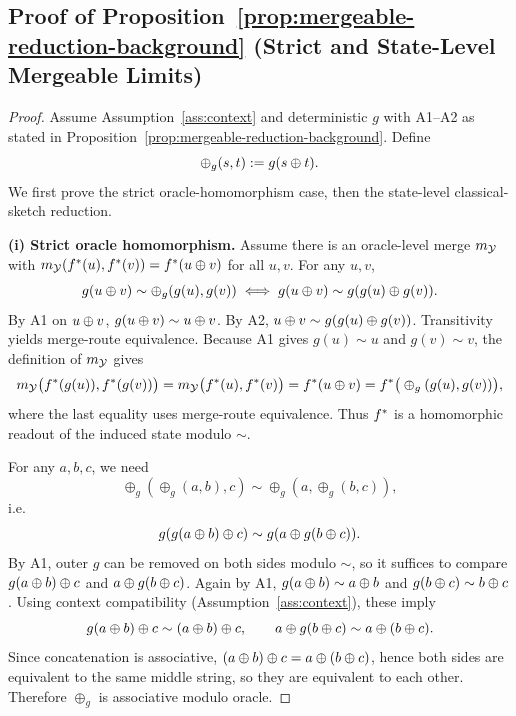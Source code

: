 \subsection{Proof of Proposition~\ref{prop:mergeable-reduction-background} (Strict and State-Level Mergeable Limits)}\label{app:proof-mergeable}

\begin{proof}
Assume Assumption~\ref{ass:context} and deterministic $g$ with A1--A2 as
stated in Proposition~\ref{prop:mergeable-reduction-background}. Define
\[
\oplus_g(s,t):=g(s\oplus t).
\]
We first prove the strict oracle-homomorphism case, then the state-level
classical-sketch reduction.

\textbf{(i) Strict oracle homomorphism.}
Assume there is an oracle-level merge $m_{\mathcal{Y}}$ with
$m_{\mathcal{Y}}(f^\ast(u),f^\ast(v))=f^\ast(u\oplus v)$ for all $u,v$.
For any $u,v$,
\[
g(u\oplus v)\sim \oplus_g(g(u),g(v))
  \iff g(u\oplus v)\sim g(g(u)\oplus g(v)).
\]
By A1 on $u\oplus v$, $g(u\oplus v)\sim u\oplus v$.
By A2, $u\oplus v\sim g(g(u)\oplus g(v))$.
Transitivity yields merge-route equivalence. Because A1 gives
$g(u)\sim u$ and $g(v)\sim v$, the definition of $m_{\mathcal{Y}}$ gives
\[
m_{\mathcal{Y}}\big(f^\ast(g(u)),f^\ast(g(v))\big)
  = m_{\mathcal{Y}}\big(f^\ast(u),f^\ast(v)\big)
  = f^\ast(u\oplus v)
  = f^\ast\big(\oplus_g(g(u),g(v))\big),
\]
where the last equality uses merge-route equivalence. Thus $f^\ast$ is a
homomorphic readout of the induced state modulo $\sim$.

For any $a,b,c$, we need
\[
\oplus_g(\oplus_g(a,b),c)\sim \oplus_g(a,\oplus_g(b,c)),
\]
i.e.
\[
g(g(a\oplus b)\oplus c)\sim g(a\oplus g(b\oplus c)).
\]
By A1, outer $g$ can be removed on both sides modulo $\sim$, so it suffices to compare
$g(a\oplus b)\oplus c$ and $a\oplus g(b\oplus c)$.
Again by A1, $g(a\oplus b)\sim a\oplus b$ and $g(b\oplus c)\sim b\oplus c$.
Using context compatibility (Assumption~\ref{ass:context}), these imply
\[
g(a\oplus b)\oplus c \sim (a\oplus b)\oplus c,\qquad
a\oplus g(b\oplus c)\sim a\oplus(b\oplus c).
\]
Since concatenation is associative, $(a\oplus b)\oplus c = a\oplus(b\oplus c)$, hence both sides are equivalent to the same middle string, so they are equivalent to each other.
Therefore $\oplus_g$ is associative modulo oracle.


\end{proof}
